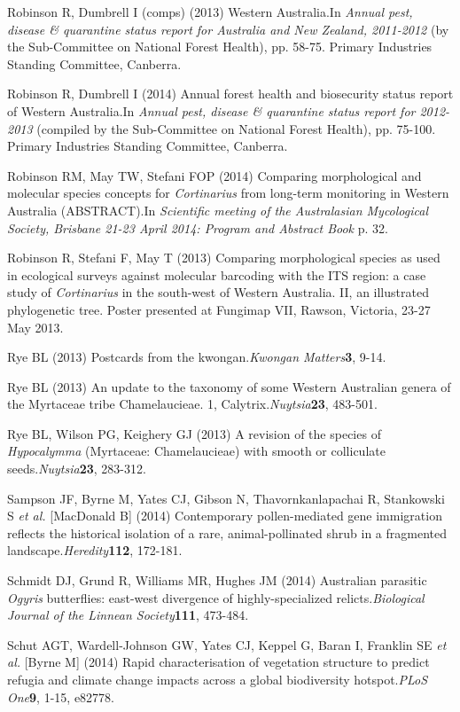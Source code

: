 \documentclass[version=last, paper=a4, DIV=18, usenames, dvipsnames]{scrartcl}
\begin{document}
Robinson R, Dumbrell I (comps) (2013) Western Australia.In \emph{Annual pest, disease \& quarantine status report for Australia and New Zealand, 2011-2012} (by the Sub-Committee on National Forest Health), pp. 58-75. Primary Industries Standing Committee, Canberra.


Robinson R, Dumbrell I (2014) Annual forest health and biosecurity status report of Western Australia.In \emph{Annual pest, disease \& quarantine status report for 2012-2013} (compiled by the Sub-Committee on National Forest Health), pp. 75-100. Primary Industries Standing Committee, Canberra.


Robinson RM, May TW, Stefani FOP (2014) Comparing morphological and molecular species concepts for \emph{Cortinarius} from long-term monitoring in Western Australia (ABSTRACT).In \emph{Scientific meeting of the Australasian Mycological Society, Brisbane 21-23 April 2014: Program and Abstract Book} p. 32.


Robinson R, Stefani F, May T (2013) Comparing morphological species as used in ecological surveys against molecular barcoding with the ITS region: a case study of \emph{Cortinarius} in the south-west of Western Australia. II, an illustrated phylogenetic tree. Poster presented at Fungimap VII, Rawson, Victoria, 23-27 May 2013.


Rye BL (2013) Postcards from the kwongan.\emph{Kwongan Matters}\textbf{3}, 9-14.


Rye BL (2013) An update to the taxonomy of some Western Australian genera of the Myrtaceae tribe Chamelaucieae. 1, Calytrix.\emph{Nuytsia}\textbf{23}, 483-501.


Rye BL, Wilson PG, Keighery GJ (2013) A revision of the species of \emph{Hypocalymma} (Myrtaceae: Chamelaucieae) with smooth or colliculate seeds.\emph{Nuytsia}\textbf{23}, 283-312.


Sampson JF, Byrne M, Yates CJ, Gibson N, Thavornkanlapachai R, Stankowski S \emph{et al.} [MacDonald B] (2014) Contemporary pollen-mediated gene immigration reflects the historical isolation of a rare, animal-pollinated shrub in a fragmented landscape.\emph{Heredity}\textbf{112}, 172-181.


Schmidt DJ, Grund R, Williams MR, Hughes JM (2014) Australian parasitic \emph{Ogyris} butterflies: east-west divergence of highly-specialized relicts.\emph{Biological Journal of the Linnean Society}\textbf{111}, 473-484.


Schut AGT, Wardell-Johnson GW, Yates CJ, Keppel G, Baran I, Franklin SE \emph{et al.} [Byrne M] (2014) Rapid characterisation of vegetation structure to predict refugia and climate change impacts across a global biodiversity hotspot.\emph{PLoS One}\textbf{9}, 1-15, e82778.
\end{document}
